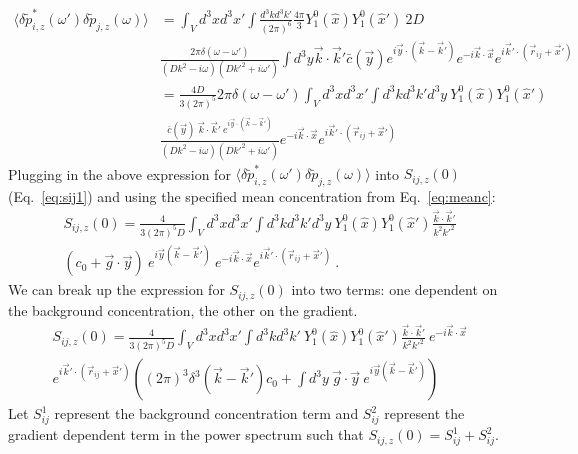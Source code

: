 \begin{align*}
    \langle\delta\tilde{p}_{i,z}^*(\omega')\delta\tilde{p}_{j,z}(\omega) \rangle &= \int_V d^3x d^3x' \int \frac{d^3kd^3k'}{(2\pi)^6}
    \frac{4\pi}{3} Y_1^0(\hat{x})Y_1^0(\hat{x}') \ 2D \\ &\frac{2\pi\delta(\omega-\omega')}{(Dk^2-i\omega)(Dk'^2+i\omega')} \int d^3y \vec{k}\cdot\vec{k}' \bar{c}(\vec{y}) e^{i\vec{y}\cdot(\vec{k}-\vec{k}')}
    e^{-i\vec{k}\cdot\vec{x}} e^{i\vec{k}'\cdot(\vec{r}_{ij}+\vec{x}')} \\
    &= \frac{4D}{3(2\pi)^5} 2\pi\delta(\omega-\omega') \int_V d^3x d^3x' \int d^3kd^3k'd^3y \ Y_1^0(\hat{x})Y_1^0(\hat{x}') \\
    &\frac{\bar{c}(\vec{y}) \ \vec{k}\cdot\vec{k}'\ e^{i\vec{y}\cdot(\vec{k}-\vec{k}')}}{(Dk^2-i\omega)(Dk'^2+i\omega')} e^{-i\vec{k}\cdot\vec{x}} e^{i\vec{k}'\cdot(\vec{r}_{ij}+\vec{x}')}
\end{align*}
Plugging in the above expression for
$\langle\delta\tilde{p}_{i,z}^*(\omega')\delta\tilde{p}_{j,z}(\omega) \rangle$
into $S_{ij,z}(0)$ (Eq.\ \ref{eq:sij1}) and using the specified mean concentration from Eq.\ \ref{eq:meanc}:
\begin{equation}
\begin{split}
    S_{ij,z}(0) = \frac{4}{3(2\pi)^5D} \int_V d^3x d^3x' \int d^3kd^3k'd^3y \ Y_1^0(\hat{x})Y_1^0(\hat{x}') \frac{\vec{k}\cdot\vec{k}'}{k^2k'^2} \\
    (c_0+\vec{g}\cdot\vec{y}) \ e^{i\vec{y}(\vec{k}-\vec{k}')} \ e^{-i\vec{k}\cdot\vec{x}} e^{i\vec{k}'\cdot(\vec{r}_{ij}+\vec{x}')} \ .
\end{split}
\end{equation}
We can break up the expression for $S_{ij,z}(0)$ into two terms: one dependent on the background concentration, the other on the gradient.
\begin{equation} \label{eq:sij3}
\begin{split}
    S_{ij,z}(0) = \frac{4}{3(2\pi)^5D} \int_V d^3x d^3x' \int d^3kd^3k' \ Y_1^0(\hat{x})Y_1^0(\hat{x}') \frac{\vec{k}\cdot\vec{k}'}{k^2k'^2} \ e^{-i\vec{k}\cdot\vec{x}} \\
    e^{i\vec{k}'\cdot(\vec{r}_{ij}+\vec{x}')}
    \left((2\pi)^3 \delta^3(\vec{k}-\vec{k}') c_0 + \int d^3y \ \vec{g}\cdot\vec{y} \ e^{i\vec{y}(\vec{k}-\vec{k}')} \right)
\end{split}
\end{equation}
Let $S_{ij}^1$ represent the background concentration term and $S_{ij}^2$ represent the gradient dependent term in the power spectrum such that $S_{ij,z}(0) = S_{ij}^1 + S_{ij}^2$.
